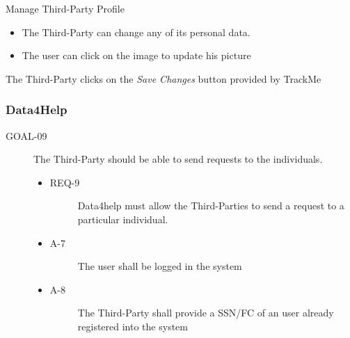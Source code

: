 \documentclass[a4paper]{article}
\newcommand{\requirement}{\ding{229}}%
\begin{document}
       \begin{usecase}{Manage Third-Party Profile}
        {\begin{itemize}
            \item The Third-Party can change any of its personal data.
            \item The user can click on the image to update his picture
        \end{itemize}}
        {The Third-Party clicks on the \textit{Save Changes} button provided by TrackMe}
       \end{usecase}
           
           
        \subsubsection{Data4Help}
      
            \begin{description}
        	\item[GOAL-09] The Third-Party should be able to send requests to the individuals. 
            	\begin{itemize}
            	    \item[\requirement]
                	\begin{description}
                	\item[REQ-9] Data4help must allow the Third-Parties to send a request to a particular individual. 
                	\end{description}
                	\item
                	\begin{description}
                	\item[A-7] The user shall be logged in the system
                	\end{description}
                	\item
                	\begin{description}
                	\item[A-8] The Third-Party shall provide a SSN/FC of an user already registered into the system
                	\end{description}
                	\end{itemize}
        \end{description}
      
\end{document}

